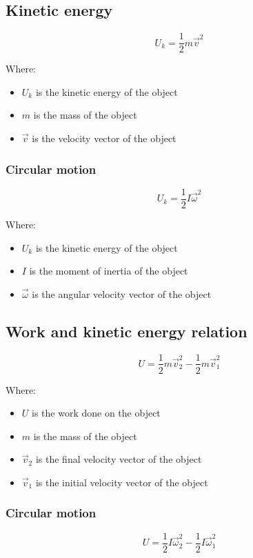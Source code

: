\documentclass[11pt]{article}
\begin{document}
\subsection{Kinetic energy}
\label{sec:orgff9ae6e}
\[U_k = \frac{1}{2} m \vec{v}^2\]

Where:
\begin{itemize}
\item \(U_k\) is the kinetic energy of the object
\item \(m\) is the mass of the object
\item \(\vec{v}\) is the velocity vector of the object
\end{itemize}

\subsubsection{Circular motion}
\label{sec:orgd89d82a}
\[U_k = \frac{1}{2} I \vec{\omega}^2\]

Where:
\begin{itemize}
\item \(U_k\) is the kinetic energy of the object
\item \(I\) is the moment of inertia of the object
\item \(\vec{\omega}\) is the angular velocity vector of the object
\end{itemize}

\subsection{Work and kinetic energy relation}
\label{sec:org4cefca5}
\[U = \frac{1}{2} m \vec{v}_2^2 - \frac{1}{2} m \vec{v}_1^2\]

Where:
\begin{itemize}
\item \(U\) is the work done on the object
\item \(m\) is the mass of the object
\item \(\vec{v}_2\) is the final velocity vector of the object
\item \(\vec{v}_1\) is the initial velocity vector of the object
\end{itemize}

\subsubsection{Circular motion}
\label{sec:org5296003}
\[U = \frac{1}{2} I \vec{\omega}_2^2 - \frac{1}{2} I \vec{\omega}_1^2\]
\end{document}
